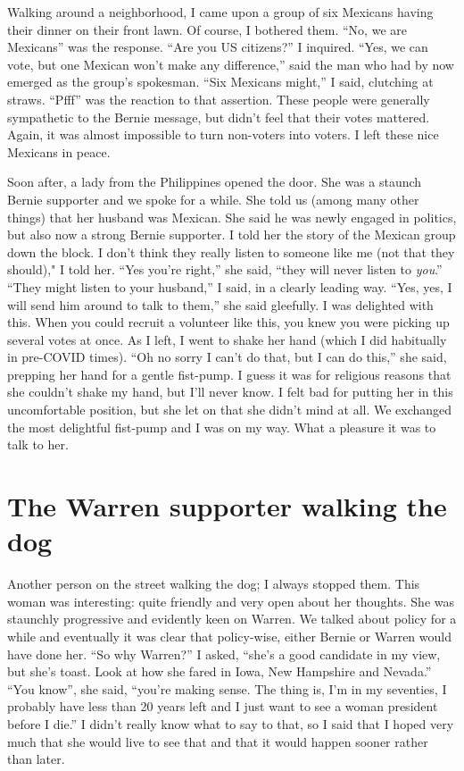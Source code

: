 \documentclass[]{book}
\begin{document}
Walking around a neighborhood, I came upon a group of six Mexicans having their dinner on their front lawn. Of course, I bothered them. ``No, we are Mexicans'' was the response. ``Are you US citizens?'' I inquired. ``Yes, we can vote, but one Mexican won't make any difference,'' said the man who had by now emerged as the group's spokesman. ``Six Mexicans might,'' I said, clutching at straws. ``Pfff'' was the reaction to that assertion. These people were generally sympathetic to the Bernie message, but didn't feel that their votes mattered. Again, it was almost impossible to turn non-voters into voters. I left these nice Mexicans in peace.

Soon after, a lady from the Philippines opened the door. She was a staunch Bernie supporter and we spoke for a while. She told us (among many other things) that her husband was Mexican. She said he was newly engaged in politics, but also now a strong Bernie supporter. I told her the story of the Mexican group down the block. I don't think they really listen to someone like me (not that they should)," I told her. ``Yes you're right,'' she said, ``they will never listen to \emph{you}.'' ``They might listen to your husband,'' I said, in a clearly leading way. ``Yes, yes, I will send him around to talk to them,'' she said gleefully. I was delighted with this. When you could recruit a volunteer like this, you knew you were picking up several votes at once. As I left, I went to shake her hand (which I did habitually in pre-COVID times). ``Oh no sorry I can't do that, but I can do this,'' she said, prepping her hand for a gentle fist-pump. I guess it was for religious reasons that she couldn't shake my hand, but I'll never know. I felt bad for putting her in this uncomfortable position, but she let on that she didn't mind at all. We exchanged the most delightful fist-pump and I was on my way. What a pleasure it was to talk to her.

\hypertarget{the-warren-supporter-walking-the-dog}{%
\section{The Warren supporter walking the dog}\label{the-warren-supporter-walking-the-dog}}

Another person on the street walking the dog; I always stopped them. This woman was interesting: quite friendly and very open about her thoughts. She was staunchly progressive and evidently keen on Warren. We talked about policy for a while and eventually it was clear that policy-wise, either Bernie or Warren would have done her. ``So why Warren?'' I asked, ``she's a good candidate in my view, but she's toast. Look at how she fared in Iowa, New Hampshire and Nevada.'' ``You know'', she said, ``you're making sense. The thing is, I'm in my seventies, I probably have less than 20 years left and I just want to see a woman president before I die.'' I didn't really know what to say to that, so I said that I hoped very much that she would live to see that and that it would happen sooner rather than later.
\end{document}
